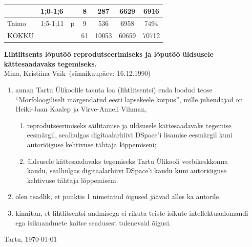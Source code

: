 \documentclass[12pt]{article}
\def\autor{Kristiina Vaik}
\def\pealkiri{Morfoloogiliselt märgendatud eesti lapsekeele korpus}
\begin{document}
\begin{table}[H]
{\begin{tabular}{|l|l|c|c|c|c|c|}
                        & 1;0-1;6   &                           & 8                               & 287                              & 6629                              & 6916                       \\ \hline
Taimo                   & 1;5-1;11  & p                         & 9                               & 536                              & 6958                              & 7494                       \\ \hline\hline
KOKKU                   & \multicolumn{2}{l|}{}                 & 61                              & 10053                            & 60659                             & 70712                      \\ \hline
\end{tabular}}
\end{table}


\newpage
\cleardoublepage
{}
{}



\newpage
\pagestyle{empty}

\textbf{Lihtlitsents lõputöö reprodutseerimiseks ja
    lõputöö üldsusele kätte\-saa\-davaks tegemiseks.}\\[0.3cm]

Mina, \autor\ (sünnikuupäev: 16.12.1990)
\begin{enumerate}
    \item annan Tartu Ülikoolile tasuta loa (lihtlitsentsi)
    enda loodud teose ``\pealkiri'', mille juhendajad on Heiki-Jaan Kaalep ja Virve-Anneli Vihman,
    \begin{enumerate}[leftmargin=0.68cm]
        \item reprodutseerimiseks säilitamise ja üldsusele
        kättesaadavaks tegemise ees\-märgil, sealhulgas
        digitaalarhiivi DSpace'i lisamise eesmärgil kuni
        autoriõiguse kehtivuse tähtaja lõppemiseni;
        \item üldsusele kättesaadavaks tegemiseks Tartu Ülikooli
        veebikeskkonna kaudu, sealhulgas digitaalarhiivi
        DSpace'i kaudu kuni autoriõiguse kehti\-vuse tähtaja lõppemiseni.
    \end{enumerate}
    \item olen teadlik, et punktis 1 nimetatud õigused jäävad
    alles ka autorile.
    \item kinnitan, et lihtlitsentsi andmisega ei rikuta teiste
    isikute intellektuaalo\-mandi ega isikuandmete kaitse
    seadusest tulenevaid õigusi.
\end{enumerate}

\vfill

\begin{center}
Tartu, \today
\end{center}
\end{document}
